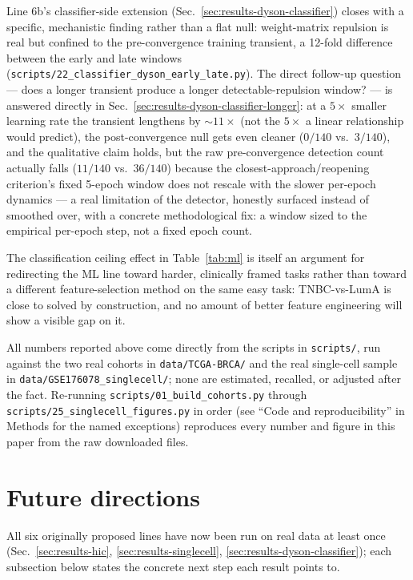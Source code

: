 \documentclass[11pt]{article}
\begin{document}
Line 6b's classifier-side extension (Sec.~\ref{sec:results-dyson-classifier})
closes with a specific, mechanistic finding rather than a flat null:
weight-matrix repulsion is real but confined to the pre-convergence
training transient, a 12-fold difference between the early and late
windows (\texttt{scripts/22\_classifier\_dyson\_early\_late.py}). The
direct follow-up question --- does a longer transient produce a longer
detectable-repulsion window? --- is answered directly in
Sec.~\ref{sec:results-dyson-classifier-longer}: at a $5\times$ smaller
learning rate the transient lengthens by $\sim\!11\times$ (not the
$5\times$ a linear relationship would predict), the post-convergence
null gets even cleaner ($0/140$ vs.\ $3/140$), and the qualitative
claim holds, but the raw pre-convergence detection count actually
falls ($11/140$ vs.\ $36/140$) because the closest-approach/reopening
criterion's fixed 5-epoch window does not rescale with the slower
per-epoch dynamics --- a real limitation of the detector, honestly
surfaced instead of smoothed over, with a concrete methodological fix:
a window sized to the empirical per-epoch step, not a fixed epoch
count.

The classification ceiling effect in Table~\ref{tab:ml} is itself an
argument for redirecting the ML line toward harder, clinically framed
tasks rather than toward a different feature-selection method on the
same easy task: TNBC-vs-LumA is close to solved by construction, and no
amount of better feature engineering will show a visible gap on it.

All numbers reported above come directly from the scripts in
\texttt{scripts/}, run against the two real cohorts in
\texttt{data/TCGA-BRCA/} and the real single-cell sample in
\texttt{data/GSE176078\_singlecell/}; none are estimated, recalled, or
adjusted after the fact. Re-running \texttt{scripts/01\_build\_cohorts.py}
through \texttt{scripts/25\_singlecell\_figures.py} in order (see
``Code and reproducibility'' in Methods for the named exceptions)
reproduces every number and figure in this paper from the raw
downloaded files.

\section{Future directions}
\label{sec:roadmap}

All six originally proposed lines have now been run on real data at
least once (Sec.~\ref{sec:results-hic}, \ref{sec:results-singlecell},
\ref{sec:results-dyson-classifier}); each subsection below states the
concrete next step each result points to.
\end{document}
